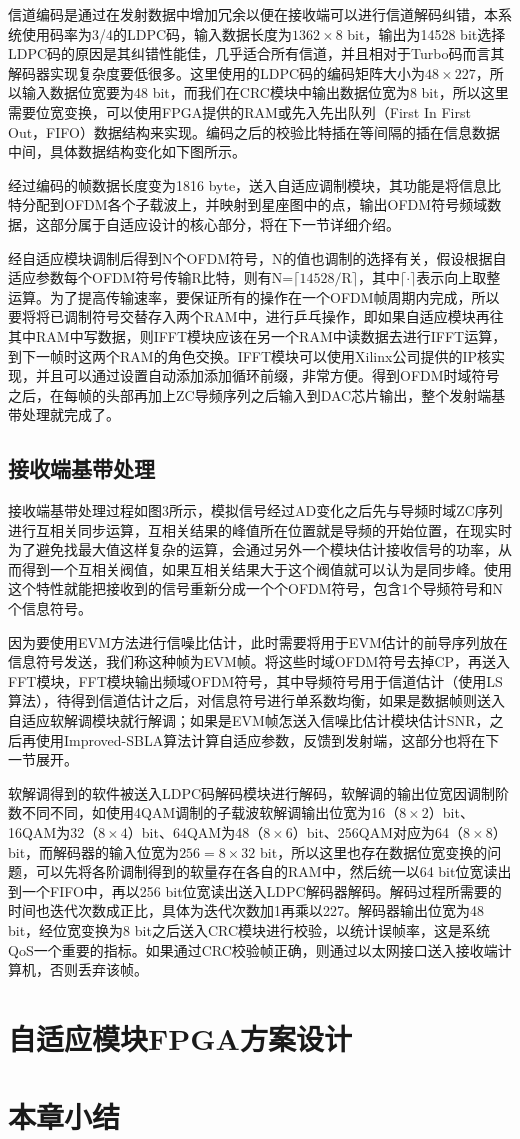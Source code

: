 信道编码是通过在发射数据中增加冗余以便在接收端可以进行信道解码纠错，本系统使用码率为3/4的LDPC码，输入数据长度为$1362\times 8$ bit，输出为14528 bit选择LDPC码的原因是其纠错性能佳，几乎适合所有信道，并且相对于Turbo码而言其解码器实现复杂度要低很多。这里使用的LDPC码的编码矩阵大小为$48\times 227$，所以输入数据位宽要为48 bit，而我们在CRC模块中输出数据位宽为8 bit，所以这里需要位宽变换，可以使用FPGA提供的RAM或先入先出队列（First In First Out，FIFO）数据结构来实现。编码之后的校验比特插在等间隔的插在信息数据中间，具体数据结构变化如下图所示。

经过编码的帧数据长度变为1816 byte，送入自适应调制模块，其功能是将信息比特分配到OFDM各个子载波上，并映射到星座图中的点，输出OFDM符号频域数据，这部分属于自适应设计的核心部分，将在下一节详细介绍。

经自适应模块调制后得到N个OFDM符号，N的值也调制的选择有关，假设根据自适应参数每个OFDM符号传输R比特，则有N=$\lceil 14528/\text{R} \rceil$，其中$\lceil \cdot \rceil$表示向上取整运算。为了提高传输速率，要保证所有的操作在一个OFDM帧周期内完成，所以要将将已调制符号交替存入两个RAM中，进行乒乓操作，即如果自适应模块再往其中RAM中写数据，则IFFT模块应该在另一个RAM中读数据去进行IFFT运算，到下一帧时这两个RAM的角色交换。IFFT模块可以使用Xilinx公司提供的IP核实现，并且可以通过设置自动添加添加循环前缀，非常方便。得到OFDM时域符号之后，在每帧的头部再加上ZC导频序列之后输入到DAC芯片输出，整个发射端基带处理就完成了。

\subsection{接收端基带处理}
接收端基带处理过程如图3所示，模拟信号经过AD变化之后先与导频时域ZC序列进行互相关同步运算，互相关结果的峰值所在位置就是导频的开始位置，在现实时为了避免找最大值这样复杂的运算，会通过另外一个模块估计接收信号的功率，从而得到一个互相关阀值，如果互相关结果大于这个阀值就可以认为是同步峰。使用这个特性就能把接收到的信号重新分成一个个OFDM符号，包含1个导频符号和N个信息符号。

因为要使用EVM方法进行信噪比估计，此时需要将用于EVM估计的前导序列放在信息符号发送，我们称这种帧为EVM帧。将这些时域OFDM符号去掉CP，再送入FFT模块，FFT模块输出频域OFDM符号，其中导频符号用于信道估计（使用LS算法），待得到信道估计之后，对信息符号进行单系数均衡，如果是数据帧则送入自适应软解调模块就行解调；如果是EVM帧怎送入信噪比估计模块估计SNR，之后再使用Improved-SBLA算法计算自适应参数，反馈到发射端，这部分也将在下一节展开。

软解调得到的软件被送入LDPC码解码模块进行解码，软解调的输出位宽因调制阶数不同不同，如使用4QAM调制的子载波软解调输出位宽为16（$8\times 2$）bit、16QAM为32（$8\times 4$）bit、64QAM为48（$8\times 6$）bit、256QAM对应为64（$8\times 8$）bit，而解码器的输入位宽为$256=8\times 32$ bit，所以这里也存在数据位宽变换的问题，可以先将各阶调制得到的软量存在各自的RAM中，然后统一以64 bit位宽读出到一个FIFO中，再以256 bit位宽读出送入LDPC解码器解码。解码过程所需要的时间也迭代次数成正比，具体为迭代次数加1再乘以227。解码器输出位宽为48 bit，经位宽变换为8 bit之后送入CRC模块进行校验，以统计误帧率，这是系统QoS一个重要的指标。如果通过CRC校验帧正确，则通过以太网接口送入接收端计算机，否则丢弃该帧。
\section{自适应模块FPGA方案设计}

\section{本章小结}